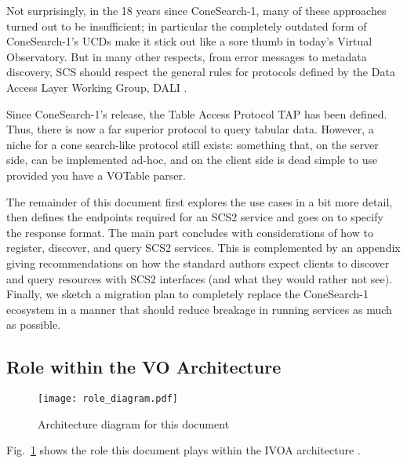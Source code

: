 \documentclass[11pt,a4paper]{ivoa}
\begin{document}
Not surprisingly, in the 18 years since ConeSearch-1, many of these approaches
turned out to be insufficient; in particular the completely outdated
form of ConeSearch-1's UCDs make it stick out like a sore thumb in today's
Virtual Observatory.  But in many other respects, from error messages to
metadata discovery, SCS should respect the general
rules for protocols defined by the Data Access Layer Working Group, DALI
\citep{2017ivoa.spec.0517D}.

Since ConeSearch-1's release, the Table Access Protocol TAP
\citep{2019ivoa.spec.0927D} has been defined.  Thus, there is now a far
superior protocol to query tabular data.  However, a niche for a cone
search-like protocol still exists: something that, on the server side,
can be implemented ad-hoc, and on the client side is dead simple to use
provided you have a VOTable parser.

The remainder of this document first explores the use cases in a bit
more detail, then defines the endpoints required for an SCS2 service and
goes on to specify the response format.  The main part 
concludes with considerations
of how to register, discover, and query SCS2 services.
This is complemented by an appendix giving recommendations on how the
standard authors expect clients to discover and query resources with
SCS2 interfaces (and what they would rather not see).  Finally, we
sketch a migration plan to completely replace the ConeSearch-1 ecosystem
in a manner that should reduce breakage in running services as much as
possible.

\subsection{Role within the VO Architecture}

\begin{figure}
\centering


\texttt{[image: role\_diagram.pdf]}
\caption{Architecture diagram for this document}
\label{fig:archdiag}
\end{figure}

Fig.~\ref{fig:archdiag} shows the role this document plays within the
IVOA architecture \citep{2021ivoa.spec.1101D}.
\end{document}
